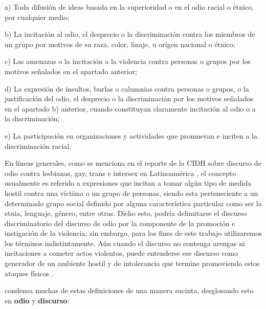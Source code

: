 \begin{displayquote}

    a) Toda difusión de ideas basada en la superioridad o en el odio racial o étnico, por cualquier medio;

    b) La incitación al odio, el desprecio o la discriminación contra los miembros de un grupo por motivos de su raza, color, linaje, u origen nacional o étnico;

    c) Las amenazas o la incitación a la violencia contra personas o grupos por los motivos señalados en el apartado anterior;

    d) La expresión de insultos, burlas o calumnias contra personas o grupos, o la justificación del odio, el desprecio o la discriminación por los motivos señalados en el apartado b) anterior, cuando constituyan claramente incitación al odio o a la discriminación;

    e) La participación en organizaciones y actividades que promuevan e inciten a la discriminación racial.
\end{displayquote}


En líneas generales, como se menciona en el reporte de la CIDH sobre discurso de odio contra lesbianas, gay, trans e intersex en Latinoamérica \cite{CIDH2015}, el concepto usualmente es referido a expresiones que incitan a tomar algún tipo de medida hostil contra una víctima o un grupo de personas, siendo esta perteneciente a un determinado grupo social definido por alguna característica particular como ser la etnia, lenguaje, género, entre otras. Dicho esto, podría delimitarse el discurso discriminatorio del discurso de odio por la componente de la promoción e instigación de la violencia; sin embargo, para los fines de este trabajo utilizaremos los términos indistintamente. Aún cuando el discurso no contenga arengas ni incitaciones a cometer actos violentos, puede entenderse ese discurso como generador de un ambiente hostil y de intolerancia que termine promoviendo estos ataques físicos \cite{CIDH2015}.

\citet{article192015} condensa muchas de estas definiciones de una manera sucinta, desglosando esto en \textbf{odio} y \textbf{discurso}:

